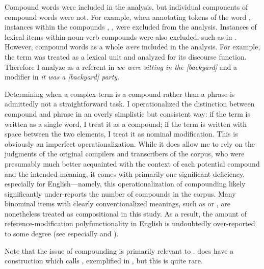 Compound words were included in the analysis, but individual components of compound words were not. For example, when annotating tokens of the word , instances within the compounds , ,  were excluded from the analysis. Instances of lexical items within noun-verb compounds  were also excluded, such as  in . However, compound words as a whole \emph{were} included in the analysis. For example, the term  was treated as a lexical unit and analyzed for its discourse function. Therefore I analyze  as a referent in \textit{we were sitting in the [backyard]} and a modifier in \textit{it was a [backyard] party}.

Determining when a complex term is a compound rather than a phrase is admittedly not a straightforward task. I operationalized the distinction between compound and phrase in an overly simplistic but consistent way: if the term is written as a single word, I treat it as a compound; if the term is written with space between the two elements, I treat it as nominal modification. This is obviously an imperfect operationalization. While it does allow me to rely on the judgments of the original compilers and transcribers of the corpus, who were presumably much better acquainted with the context of each potential compound and the intended meaning, it comes with primarily one significant deficiency, especially for English—namely, this operationalization of compounding likely significantly under-reports the number of compounds  in the corpus. Many binominal items with clearly conventionalized meanings, such as  or , are nonetheless treated as compositional in this study. As a result, the amount of reference-modification polyfunctionality in English is undoubtedly over-reported to some degree (see especially  and ).

Note that the issue of compounding is primarily relevant to .  does have a construction which \textcite[90]{Nakayama2001} calls , exemplified in , but this is quite rare.

